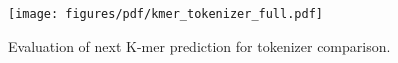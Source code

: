 \begin{figure}[ht]
    \centering
    \texttt{[image: figures/pdf/kmer\_tokenizer\_full.pdf]}
    \caption{Evaluation of next K-mer prediction for tokenizer comparison.}
    \label{fig:kmer_tokenizer}
\end{figure}